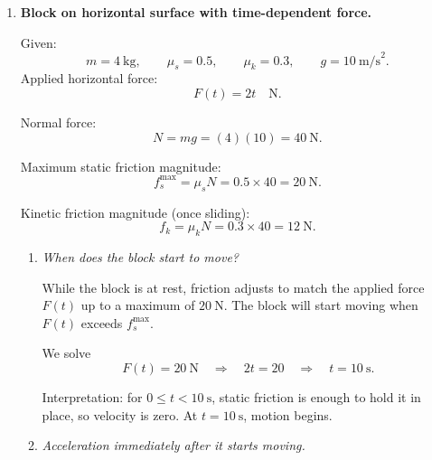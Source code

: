 \documentclass[../main.tex]{subfiles}
\begin{document}
\begin{enumerate}
So
\[
m_3 \mathbf{v}_3
= - (12\,\hat{\imath} + 12\,\hat{\jmath})
= (-12)\,\hat{\imath} + (-12)\,\hat{\jmath}.
\]

Since $m_3=6~\text{kg}$,
\[
\mathbf{v}_3
= \frac{1}{6}(-12\,\hat{\imath} - 12\,\hat{\jmath})
= (-2)\,\hat{\imath} + (-2)\,\hat{\jmath}
\quad \text{m/s}.
\]

So the third fragment moves with velocity
\[
\mathbf{v}_3 = (-2, -2)~\text{m/s}.
\]

Speed:
\[
v_3 = \sqrt{(-2)^2 + (-2)^2}
= \sqrt{4+4}
= \sqrt{8}
= 2\sqrt{2} \approx 2.83~\text{m/s}.
\]

Direction: both components are negative, so it moves toward the southwest, at $45^\circ$ below the $-x$ axis (i.e. equally south and west).

We can express the direction angle $\theta$ measured from due west toward south:
\[
\tan \theta = \frac{2}{2} = 1
\quad\Rightarrow\quad
\theta = 45^\circ.
\]

Thus $m_3$ moves to the southwest at $2\sqrt{2}~\text{m/s}$.


\item \textbf{Block on horizontal surface with time-dependent force.}

Given:
\[
m = 4~\text{kg}, \qquad
\mu_s = 0.5, \qquad
\mu_k = 0.3, \qquad
g=10~\text{m/s}^2.
\]
Applied horizontal force:
\[
F(t) = 2t \quad \text{N}.
\]

Normal force:
\[
N = mg = (4)(10) = 40~\text{N}.
\]

Maximum static friction magnitude:
\[
f_s^{\max} = \mu_s N = 0.5 \times 40 = 20~\text{N}.
\]

Kinetic friction magnitude (once sliding):
\[
f_k = \mu_k N = 0.3 \times 40 = 12~\text{N}.
\]

\begin{enumerate}
    \item \textit{When does the block start to move?}

    While the block is at rest, friction adjusts to match the applied force $F(t)$ up to a maximum of $20~\text{N}$. The block will start moving when $F(t)$ exceeds $f_s^{\max}$.

    We solve
    \[
    F(t) = 20~\text{N}
    \quad\Rightarrow\quad
    2t = 20
    \quad\Rightarrow\quad
    t = 10~\text{s}.
    \]

    Interpretation: for $0 \le t < 10~\text{s}$, static friction is enough to hold it in place, so velocity is zero. At $t=10~\text{s}$, motion begins.

    \item \textit{Acceleration immediately after it starts moving.}


\end{enumerate}
\end{enumerate}
\end{document}
